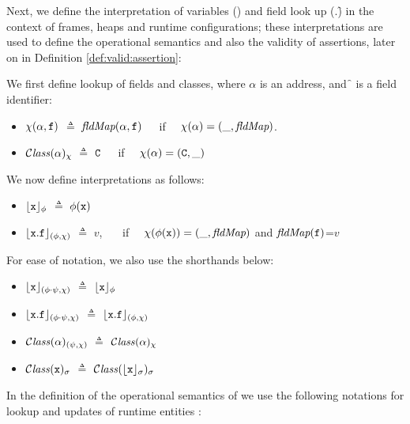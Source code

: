 Next, we define the interpretation of variables (\x) and   field look up  (\x.\f)
in the context of frames,
heaps and runtime configurations; these interpretations are used to define the operational semantics and  also  the
validity of assertions, later on in Definition \ref{def:valid:assertion}:

\begin{definition}[Interpretations]
\label{def:interp}
We first define lookup of fields and classes, where $\alpha$ is an address, and \f\, is a field identifier:
\begin{itemize}
\item
$\chi ({\alpha},{{\mbox{\tt{f}}}})$ $\triangleq$  $\textit{fldMap}({\alpha},{{\mbox{\tt{f}}}})$\ \ \ if \ \ $\chi(\alpha)=(\_, \textit{fldMap})$.
\item
${\mathcal C}{\mathit{lass}}(\alpha)_{\chi} $ $\triangleq$ ${\mbox{\tt{C}}}$\  \ \ if \ \ $\chi(\alpha)=({\mbox{\tt{C}}},\_)$
\end{itemize}

\noindent
We now define interpretations  as follows:

\begin{itemize}
\item
${\lfloor{ {{\mbox{\tt{x}}}}}\rfloor_{\phi}} $ $\triangleq$ $\phi({\mbox{\tt{x}}})$
\item
${\lfloor{ {{\mbox{\tt{x}}}.{\mbox{\tt{f}}}}}\rfloor_{(\phi,\chi)}} $ $\triangleq$ $v$, \ \ \ if \ \ $\chi(\phi({\mbox{\tt{x}}}))=(\_, \textit{fldMap})$ and $\textit{fldMap}({\mbox{\tt{f}}})$=$v$

\end{itemize}

\noindent
For ease of notation, we also use the shorthands below:
\begin{itemize}
\item
${\lfloor{ {{\mbox{\tt{x}}}}}\rfloor_{(\phi\cdot\psi,\chi)}} $ $\triangleq$ ${\lfloor{ {{\mbox{\tt{x}}}}}\rfloor_{\phi}} $
\item
${\lfloor{ {{\mbox{\tt{x}}}.{\mbox{\tt{f}}}}}\rfloor_{(\phi\cdot\psi,\chi)}} $ $\triangleq$ ${\lfloor{ {{\mbox{\tt{x}}}.{\mbox{\tt{f}}}}}\rfloor_{(\phi,\chi)}} $
\item
${\mathcal C}{\mathit{lass}}(\alpha)_{(\psi,\chi)} $ $\triangleq$ ${\mathcal C}{\mathit{lass}}(\alpha)_{\chi} $
\item
${\mathcal C}{\mathit{lass}}({\mbox{\tt{x}}})_{\sigma} $ $\triangleq$ ${\mathcal C}{\mathit{lass}}({\lfloor{ {{\mbox{\tt{x}}}}}\rfloor_{\sigma}})_{\sigma} $
\end{itemize}

\end{definition}

In the definition of the operational semantics of \LangOO we use the following notations for lookup and updates of runtime entities :

